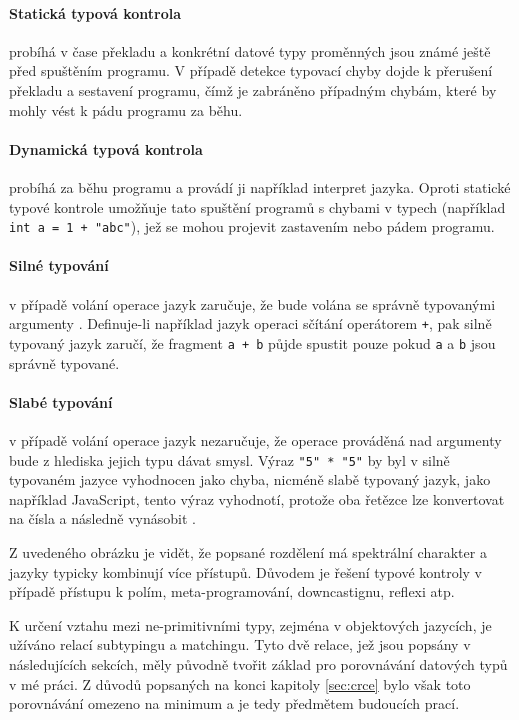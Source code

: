\documentclass[czech,DP]{thesiskiv}
\begin{document}
\paragraph{Statická typová kontrola} probíhá v čase překladu a konkrétní datové typy proměnných jsou známé ještě před spuštěním programu. V případě detekce typovací chyby dojde k přerušení překladu a sestavení programu, čímž je zabráněno případným chybám, které by mohly vést k pádu programu za běhu.

\paragraph{Dynamická typová kontrola} probíhá za běhu programu a provádí ji například interpret jazyka. Oproti statické typové kontrole umožňuje tato spuštění programů s chybami v typech (například \verb|int a = 1 + "abc"|), jež se mohou projevit zastavením nebo pádem programu.

\paragraph{Silné typování} v případě volání operace jazyk zaručuje, že bude volána se správně typovanými argumenty \cite{mogensen2010}. Definuje-li například jazyk operaci sčítání operátorem \verb|+|, pak silně typovaný jazyk zaručí, že fragment \verb|a + b| půjde spustit pouze pokud \verb|a| a \verb|b| jsou správně typované.

\paragraph{Slabé typování} v případě volání operace jazyk nezaručuje, že operace prováděná nad argumenty bude z hlediska jejich typu dávat smysl. Výraz \verb|"5" * "5"| by byl v silně typovaném jazyce vyhodnocen jako chyba, nicméně slabě typovaný jazyk, jako například JavaScript, tento výraz vyhodnotí, protože oba řetězce lze konvertovat na čísla a následně vynásobit \cite{mogensen2010}. 

Z uvedeného obrázku je vidět, že popsané rozdělení má spektrální charakter a jazyky typicky kombinují více přístupů. Důvodem je řešení typové kontroly v případě přístupu k polím, meta-programování, downcastignu, reflexi atp. 

K určení vztahu mezi ne-primitivními typy, zejména v objektových jazycích, je užíváno relací subtypingu a matchingu. Tyto dvě relace, jež jsou popsány v následujících sekcích, měly původně tvořit základ pro porovnávání datových typů v mé práci. Z důvodů popsaných na konci kapitoly \ref{sec:crce} bylo však toto porovnávání omezeno na minimum a je tedy předmětem budoucích prací.
\end{document}
